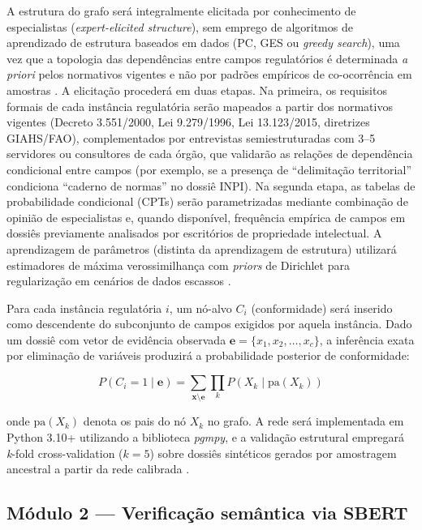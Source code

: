 A estrutura do grafo será integralmente elicitada por conhecimento de especialistas (\textit{expert-elicited structure}), sem emprego de algoritmos de aprendizado de estrutura baseados em dados (PC, GES ou \textit{greedy search}), uma vez que a topologia das dependências entre campos regulatórios é determinada \textit{a priori} pelos normativos vigentes e não por padrões empíricos de co-ocorrência em amostras \cite{Pearl2009}. A elicitação procederá em duas etapas. Na primeira, os requisitos formais de cada instância regulatória serão mapeados a partir dos normativos vigentes (Decreto 3.551/2000, Lei 9.279/1996, Lei 13.123/2015, diretrizes GIAHS/FAO), complementados por entrevistas semiestruturadas com 3--5 servidores ou consultores de cada órgão, que validarão as relações de dependência condicional entre campos (por exemplo, se a presença de ``delimitação territorial'' condiciona ``caderno de normas'' no dossiê INPI). Na segunda etapa, as tabelas de probabilidade condicional (CPTs) serão parametrizadas mediante combinação de opinião de especialistas e, quando disponível, frequência empírica de campos em dossiês previamente analisados por escritórios de propriedade intelectual. A aprendizagem de parâmetros (distinta da aprendizagem de estrutura) utilizará estimadores de máxima verossimilhança com \textit{priors} de Dirichlet para regularização em cenários de dados escassos \cite{Koller2009}.

Para cada instância regulatória $i$, um nó-alvo $C_i$ (conformidade) será inserido como descendente do subconjunto de campos exigidos por aquela instância. Dado um dossiê com vetor de evidência observada $\mathbf{e} = \{x_1, x_2, \ldots, x_c\}$, a inferência exata por eliminação de variáveis produzirá a probabilidade posterior de conformidade:

\begin{equation}
P(C_i = 1 \mid \mathbf{e}) = \sum_{\mathbf{x} \setminus \mathbf{e}} \prod_{k} P(X_k \mid \text{pa}(X_k))
\label{eq:bayesconf_cap5}
\end{equation}

\noindent onde $\text{pa}(X_k)$ denota os pais do nó $X_k$ no grafo. A rede será implementada em Python 3.10+ utilizando a biblioteca \textit{pgmpy}, e a validação estrutural empregará \textit{k}-fold cross-validation ($k = 5$) sobre dossiês sintéticos gerados por amostragem ancestral a partir da rede calibrada \cite{Pearl2009}.

\subsection{Módulo 2 --- Verificação semântica via SBERT}
\label{subsec:sbert_cap5}

